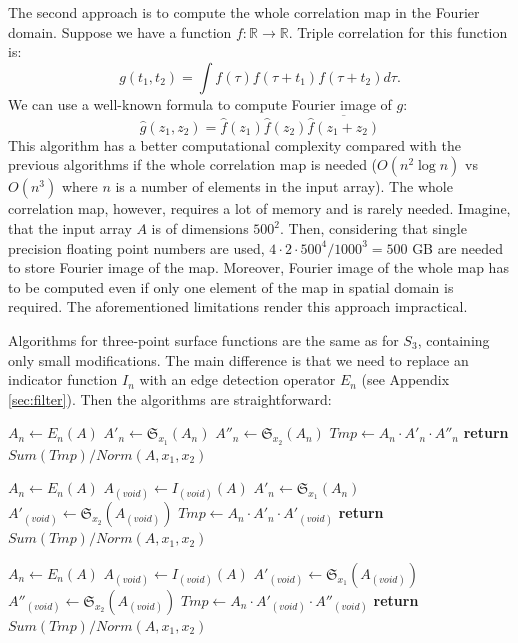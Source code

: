 \documentclass[reprint,amsmath,amssymb,aps,pre,showkeys,showpacs]{revtex4-1}
\begin{document}
The second approach is to compute the whole correlation map in the Fourier
domain. Suppose we have a function
$f: \mathbb{R} \rightarrow \mathbb{R}$. Triple correlation for this function is:
\begin{equation}
  g(t_1, t_2) = \int f(\tau) f(\tau + t_1) f(\tau + t_2) d \tau.
\end{equation}
We can use a well-known formula to compute Fourier image of $g$:
\begin{equation}
  \hat{g}(z_1, z_2) = \hat{f}(z_1) \hat{f}(z_2) \overline{\hat{f}(z_1 + z_2)}
\end{equation}
This algorithm has a better computational complexity compared with the previous
algorithms if the whole correlation map is needed ($O(n^2 \log n)$ vs
$O(n^3)$ where $n$ is a number of elements in the input array). The whole
correlation map, however, requires a lot of memory and is rarely
needed. Imagine, that the input array $A$ is of dimensions $500^2$. Then,
considering that single precision floating point numbers are used,
$4 \cdot 2 \cdot 500^4 / 1000^3 = 500$ GB are needed to store Fourier image of
the map. Moreover, Fourier image of the whole map has to be computed even if
only one element of the map in spatial domain is required. The aforementioned
limitations render this approach impractical.

Algorithms for three-point surface functions are the same as for $S_3$,
containing only small modifications. The main difference is that we need to
replace an indicator function $I_n$ with an edge detection operator $E_n$
(see Appendix \ref{sec:filter}). Then the algorithms are straightforward:
\begin{algorithmic}[1]
  \State $A_n \gets E_n (A)$
  \State $A'_n \gets \mathfrak{S}_{x_1}(A_n)$
  \State $A''_n \gets \mathfrak{S}_{x_2}(A_n)$
  \State $Tmp \gets A_n \cdot A'_n \cdot A''_n$
  \State \textbf{return} $Sum(Tmp) / Norm(A, x_1, x_2)$
  \EndProcedure

  \State $A_n \gets E_n (A)$
  \State $A_{(void)} \gets I_{(void)} (A)$
  \State $A'_n \gets \mathfrak{S}_{x_1}(A_n)$
  \State $A'_{(void)} \gets \mathfrak{S}_{x_2}(A_{(void)})$
  \State $Tmp \gets A_n \cdot A'_n \cdot A'_{(void)}$
  \State \textbf{return} $Sum(Tmp) / Norm(A, x_1, x_2)$
  \EndProcedure

  \State $A_n \gets E_n (A)$
  \State $A_{(void)} \gets I_{(void)} (A)$
  \State $A'_{(void)} \gets \mathfrak{S}_{x_1}(A_{(void)})$
  \State $A''_{(void)} \gets \mathfrak{S}_{x_2}(A_{(void)})$
  \State $Tmp \gets A_n \cdot A'_{(void)} \cdot A''_{(void)}$
  \State \textbf{return} $Sum(Tmp) / Norm(A, x_1, x_2)$
  \EndProcedure
\end{algorithmic}
\end{document}
